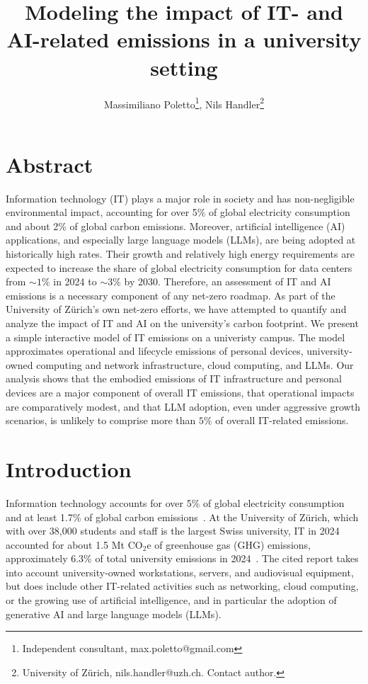 \documentclass[11pt]{article}
\title{Modeling the impact of IT- and AI-related emissions in a university setting}
\author{Massimiliano Poletto\thanks{Independent consultant, max.poletto@gmail.com}, Nils Handler\thanks{University of Zürich, nils.handler@uzh.ch. Contact author.}}
\begin{document}
\maketitle

\section{Abstract}
Information technology (IT) plays a major role in society and has non-negligible environmental impact, accounting for over 5\% of global electricity consumption and about 2\% of global carbon emissions. Moreover, artificial intelligence (AI) applications, and especially large language models (LLMs), are being adopted at historically high rates. Their growth and relatively high energy requirements are expected to increase the share of global electricity consumption for data centers from $\sim 1\%$ in 2024 to $\sim 3\%$ by 2030. Therefore, an assessment of IT and AI emissions is a necessary component of any net-zero roadmap. As part of the University of Zürich's own net-zero efforts, we have attempted to quantify and analyze the impact of IT and AI on the university's carbon footprint. We present a simple interactive model of IT emissions on a univeristy campus. The model approximates operational and lifecycle emissions of personal devices, university-owned computing and network infrastructure, cloud computing, and LLMs. Our analysis shows that the embodied emissions of IT infrastructure and personal devices are a major component of overall IT emissions, that operational impacts are comparatively modest, and that LLM adoption, even under aggressive growth scenarios, is unlikely to comprise more than $5\%$ of overall IT-related emissions.

\section{Introduction}

Information technology accounts for over 5\% of global electricity consumption and at least 1.7\% of global carbon emissions~\cite{wb:itu:ict}. At the University of Zürich, which with over 38,000 students and staff is the largest Swiss university, IT in 2024 accounted for about 1.5 Mt CO$_2$e of greenhouse gas (GHG) emissions, approximately 6.3\% of total university emissions in 2024~\cite{uzh:sustainability:report}. The cited report takes into account university-owned workstations, servers, and audiovisual equipment, but does include other IT-related activities such as networking, cloud computing, or the growing use of artificial intelligence, and in particular the adoption of generative AI and large language models (LLMs).
\end{document}
